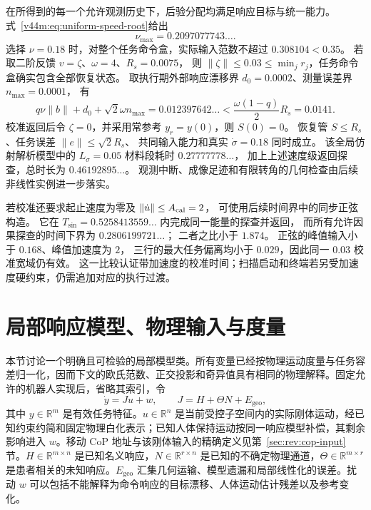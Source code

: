 \documentclass[11pt,a4paper]{article}
\numberwithin{equation}{section}
\theoremstyle{definition}
\begin{document}
在所得到的每一个允许观测历史下，后验分配均满足响应目标与统一能力。
式~\eqref{v44m:eq:uniform-speed-root}给出
\begin{equation}
 \nu_{\max}=0.2097077743\ldots.
\end{equation}
选择 $\nu=0.18$ 时，对整个任务命令盒，实际输入范数不超过
$0.308104<0.35$。
若取二阶反馈 $v=\zeta$、$\omega=4$、$R_s=0.0075$，
则 $\|\zeta\|\le0.03\le\min_jr_j$，任务命令盒确实包含全部恢复状态。
取执行期外部响应漂移界 $d_0=0.0002$、测量误差界 $n_{\max}=0.0001$，
有
\begin{equation}
 q\nu\|b\|+d_0+\sqrt2\omega n_{\max}
 =0.012397642\ldots
 <\frac{\omega(1-q)}2R_s=0.0141.
\end{equation}
校准返回后令 $\zeta=0$，并采用常参考 $y_r=y(0)$，则 $S(0)=0$。
恢复管 $S\le R_s$、任务误差 $\|e\|\le\sqrt2R_s$、
共同输入能力和真实 $\dot\sigma=0.18$ 同时成立。
该全局仿射解析模型中的 $L_\sigma=0.05$ 材料段耗时 $0.27777778\ldots$，
加上上述速度级返回探查，总时长为 $0.46192895\ldots$。
观测中断、成像足迹和有限转角的几何检查由后续非线性实例进一步落实。

若校准还要求起止速度为零及 $\|\dot u\|\le A_{\rm cal}=2$，
可使用后续时间界中的同步正弦构造。
它在 $T_{\sin}=0.5258413559\ldots$ 内完成同一能量的探查并返回，
而所有允许因果探查的时间下界为 $0.2806199721\ldots$；
二者之比小于 $1.874$。
正弦的峰值输入小于 $0.168$、峰值加速度为 $2$，
三行的最大任务偏离均小于 $0.029$，因此同一 $0.03$ 校准宽域仍有效。
这一比较认证带加速度的校准时间；扫描启动和终端若另受加速度硬约束，仍需追加对应的执行过渡。


\section{局部响应模型、物理输入与度量}
\label{sec:cal-local}

本节讨论一个明确且可检验的局部模型类。所有变量已经按物理运动度量与任务容差归一化，因而下文的欧氏范数、正交投影和奇异值具有相同的物理解释。固定允许的机器人实现后，省略其索引，令
\begin{equation}
  \dot y=Ju+w,\qquad
  J=H+\Theta N+E_{\mathrm{geo}},
  \label{eq:cal-model}
\end{equation}
其中 $y\in\mathbb R^m$ 是有效任务特征。$u\in\mathbb R^n$ 是当前受控子空间内的实际刚体运动，经已知约束约简和固定物理白化表示；已知人体保持运动按同一响应模型补偿，其剩余影响进入 $w$。移动 CoP 地址与该刚体输入的精确定义见第~\ref{sec:rev:cop-input}节。$H\in\mathbb R^{m\times n}$ 是已知名义响应，$N\in\mathbb R^{r\times n}$ 是已知的不确定物理通道，$\Theta\in\mathbb R^{m\times r}$ 是患者相关的未知响应。$E_{\mathrm{geo}}$ 汇集几何运输、模型遗漏和局部线性化的误差。扰动 $w$ 可以包括不能解释为命令响应的目标漂移、人体运动估计残差以及参考变化。
\end{document}
